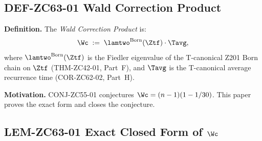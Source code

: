 \documentclass[12pt, a4paper]{article}
\begin{document}
\subsection{DEF-ZC63-01 \quad Wald Correction Product}
\label{sec:def01}


\begin{formalbox}[title={DEF-ZC63-01: Wald Correction Product $\Wc$}]
\textbf{Definition.}
The \emph{Wald Correction Product} is:
\[
  \Wc \;:=\; \lamtwo^{\rm Born}(\Ztf)\cdot\Tavg,
\]
where $\lamtwo^{\rm Born}(\Ztf)$ is the Fiedler eigenvalue of
the T-canonical Z201 Born chain on $\Ztf$
(THM-ZC42-01, Part~F), and $\Tavg$ is the T-canonical
average recurrence time (COR-ZC62-02, Part~H).

\textbf{Motivation.}
CONJ-ZC55-01 conjectures $\Wc = (n-1)(1-1/30)$.
This paper proves the exact form and closes the conjecture.
\end{formalbox}

\subsection{LEM-ZC63-01 \quad Exact Closed Form of $\Wc$}
\label{sec:lem01}

\end{document}
